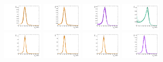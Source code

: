 \begin{figure}[htbp]
  \includegraphics[width=0.18\textwidth]{fig/2Dfit/templateSignalVsMX_fromDC_RadToWW_MJJ_mu_LP_nobb_HDy.pdf}
  \includegraphics[width=0.18\textwidth]{fig/2Dfit/templateSignalVsMX_fromDC_ZprToWW_MJJ_mu_LP_nobb_HDy.pdf}
  \includegraphics[width=0.18\textwidth]{fig/2Dfit/templateSignalVsMX_fromDC_WprToWZ_MJJ_mu_LP_nobb_HDy.pdf}
  \includegraphics[width=0.18\textwidth]{fig/2Dfit/templateSignalVsMX_fromDC_WprToWH_MJJ_mu_LP_nobb_HDy.pdf}\\
  \includegraphics[width=0.18\textwidth]{fig/2Dfit/templateSignalVsMX_fromDC_GbuToWW_MJJ_mu_HP_vbf_HDy.pdf}
  \includegraphics[width=0.18\textwidth]{fig/2Dfit/templateSignalVsMX_fromDC_RadToWW_MJJ_mu_HP_vbf_HDy.pdf}
  \includegraphics[width=0.18\textwidth]{fig/2Dfit/templateSignalVsMX_fromDC_ZprToWW_MJJ_mu_HP_vbf_HDy.pdf}
  \includegraphics[width=0.18\textwidth]{fig/2Dfit/templateSignalVsMX_fromDC_WprToWZ_MJJ_mu_HP_vbf_HDy.pdf}

\end{figure}
